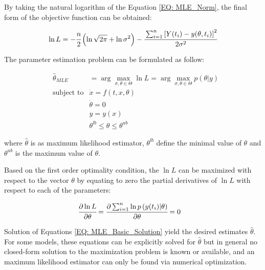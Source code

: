 \documentclass[../Article_Model_Parameters.tex]{subfiles}
\begin{document}
		By taking the natural logarithm of the Equation \ref{EQ: MLE_Norm}, the final form of the objective function can be obtained:
		
		{\footnotesize
			\begin{equation}
				\ln L = -\cfrac{n}{2} \left( \ln \sqrt{2 \pi} + \ln \sigma^2 \right)
				- \cfrac{ \sum_{i=1}^{n} \left[  Y(t_i) - y(\theta , t_i) \right]^2 }{2 \sigma^2}
			\end{equation}
		}
		
		The parameter estimation problem can be formulated as follow:
		
		{\footnotesize
			\begin{equation}
				\begin{aligned} \label{EQ: Optimization_formulation_MLE}
					&\hat{\theta}_{MLE} &= \arg \max_{\sigma, \theta \in \Theta} \ln L = \arg \max_{\sigma,\theta \in \Theta} p(\theta|y) \\
					&\text{subject to}
					& \dot{x} = f(t,x,\theta) \\
					&& \dot{\theta} = 0 \\
					&& y = y(x) \\
					&& \theta^{lb} \leq \theta \leq \theta^{ub}
				\end{aligned}
		\end{equation} } 
	
		where $\hat{\theta}$ is as maximum likelihood estimator, $\theta^{lb}$ define the minimal value of $\theta$ and $\theta^{ub}$ is the maximum value of $\theta$.
		
		Based on the first order optimality condition, the $\ln L$ can be maximized with respect to the vector $\theta$ by equating to zero the partial derivatives of $\ln L$ with respect to each of the parameters:
		
		{\footnotesize
			\begin{align}\label{EQ: MLE_Basic_Solution}
				\cfrac{\partial \ln L}{\partial \theta} &= \cfrac{\partial \sum_{i=1}^{n} \ln p\left( y(t_i) | \theta \right) }{\partial \theta} = 0 
		\end{align} }
		
		Solution of Equations \ref{EQ: MLE_Basic_Solution} yield the desired estimates $\hat{\theta}$. For some models, these equations can be explicitly solved for $\hat{\theta}$ but in general no closed-form solution to the maximization problem is known or available, and an maximum likelihood estimator can only be found via numerical optimization.
		
\end{document}
